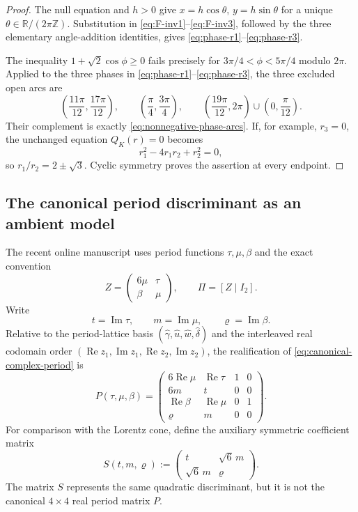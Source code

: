 \documentclass[11pt]{article}
\numberwithin{equation}{section}
\theoremstyle{definition}
\theoremstyle{remark}
\newcommand{\R}{\mathbb R}
\newcommand{\Z}{\mathbb Z}
\begin{document}
\begin{proof}
The null equation and $h>0$ give
$x=h\cos\theta$, $y=h\sin\theta$ for a unique
$\theta\in\R/(2\pi\Z)$.  Substitution in
\eqref{eq:F-inv1}--\eqref{eq:F-inv3}, followed by the three elementary
angle-addition identities, gives
\eqref{eq:phase-r1}--\eqref{eq:phase-r3}.

The inequality $1+\sqrt2\cos\phi\geq0$ fails precisely for
$3\pi/4<\phi<5\pi/4$ modulo $2\pi$.  Applied to the three phases in
\eqref{eq:phase-r1}--\eqref{eq:phase-r3}, the three excluded open arcs are
\[
 \left(\frac{11\pi}{12},\frac{17\pi}{12}\right),\qquad
 \left(\frac\pi4,\frac{3\pi}4\right),\qquad
 \left(\frac{19\pi}{12},2\pi\right)
 \cup\left(0,\frac\pi{12}\right).
\]
Their complement is exactly \eqref{eq:nonnegative-phase-arcs}.  If, for
example, $r_3=0$, the unchanged equation $Q_K(r)=0$ becomes
\[
 r_1^2-4r_1r_2+r_2^2=0,
\]
so $r_1/r_2=2\pm\sqrt3$.  Cyclic symmetry proves the assertion at every
endpoint.
\end{proof}

\subsection{The canonical period discriminant as an ambient model}

The recent online manuscript \citet{AlpogeS6_2026} uses period functions
$\tau,\mu,\beta$ and the exact convention
\begin{equation}\label{eq:canonical-complex-period}
 Z=\begin{pmatrix}6\mu&\tau\\ \beta&\mu\end{pmatrix},
 \qquad \Pi=[Z\mid I_2].
\end{equation}
Write
\[
 t=\operatorname{Im}\tau,\qquad
 m=\operatorname{Im}\mu,\qquad
 \varrho=\operatorname{Im}\beta.
\]
Relative to the period-lattice basis
$(\widehat\gamma,\widehat u,\widehat w,\widehat\delta)$ and the interleaved
real codomain order
$(\operatorname{Re}z_1,\operatorname{Im}z_1,
  \operatorname{Re}z_2,\operatorname{Im}z_2)$,
the realification of \eqref{eq:canonical-complex-period} is
\begin{equation}\label{eq:canonical-real-period}
 P(\tau,\mu,\beta)=
 \begin{pmatrix}
  6\operatorname{Re}\mu&\operatorname{Re}\tau&1&0\\
  6m&t&0&0\\
  \operatorname{Re}\beta&\operatorname{Re}\mu&0&1\\
  \varrho&m&0&0
 \end{pmatrix}.
\end{equation}
For comparison with the Lorentz cone, define the auxiliary symmetric
coefficient matrix
\begin{equation}\label{eq:symmetric-coefficient-matrix}
 S(t,m,\varrho)
 :=\begin{pmatrix}t&\sqrt6\,m\\ \sqrt6\,m&\varrho\end{pmatrix}.
\end{equation}
The matrix $S$ represents the same quadratic discriminant, but it is not the
canonical $4\times4$ real period matrix $P$.
\end{document}
